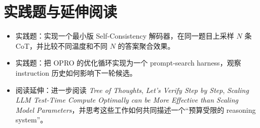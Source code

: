 \section{实践题与延伸阅读}

\begin{itemize}
\item 实践题：实现一个最小版 Self-Consistency 解码器，在同一题目上采样 $N$ 条 CoT，并比较不同温度和不同 $N$ 的答案聚合效果。
\item 实践题：把 OPRO 的优化循环实现为一个 prompt-search harness，观察 instruction 历史如何影响下一轮候选。
\item 阅读延伸：进一步阅读 \emph{Tree of Thoughts}, \emph{Let's Verify Step by Step}, \emph{Scaling LLM Test-Time Compute Optimally can be More Effective than Scaling Model Parameters}，并思考这些工作如何共同描述一个“预算受限的 reasoning system”。
\end{itemize}
